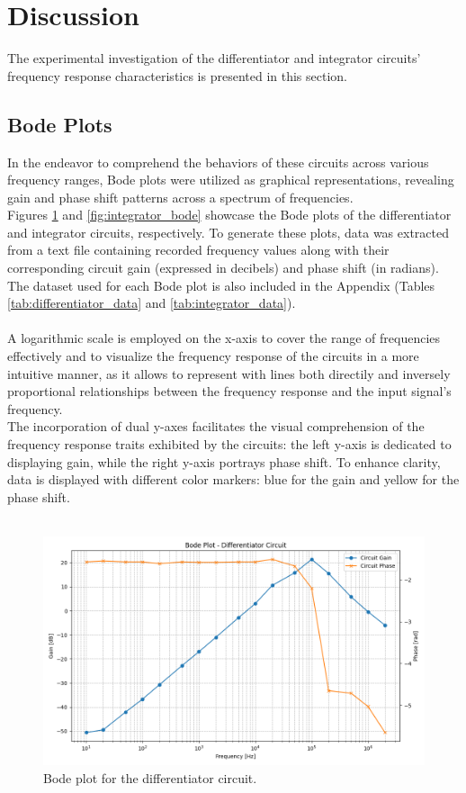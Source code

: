 \section{Discussion}
	The experimental investigation of the differentiator and integrator circuits' frequency response characteristics is presented in this section.
	
	\subsection{Bode Plots}
		In the endeavor to comprehend the behaviors of these circuits across various frequency ranges, Bode plots were utilized as graphical representations, revealing gain and phase shift patterns across a spectrum of frequencies. \\
		Figures \ref{fig:differentiator_bode} and \ref{fig:integrator_bode} showcase the Bode plots of the differentiator and integrator circuits, respectively.
		To generate these plots, data was extracted from a text file containing recorded frequency values along with their corresponding circuit gain (expressed in decibels) and phase shift (in radians). 
		The dataset used for each Bode plot is also included in the Appendix (Tables \ref{tab:differentiator_data} and \ref{tab:integrator_data}). \\\\
		A logarithmic scale is employed on the x-axis to cover the range of frequencies effectively and to visualize the frequency response of the circuits in a more intuitive manner,
		as it allows to represent with lines both directily and inversely proportional relationships between the frequency response and the input signal's frequency. \\
		The incorporation of dual y-axes facilitates the visual comprehension of the frequency response traits exhibited by the circuits: 
		the left y-axis is dedicated to displaying gain, while the right y-axis portrays phase shift.
		To enhance clarity, data is displayed with different color markers: blue for the gain and yellow for the phase shift. \\\\

		\begin{figure}[H]
			\centering
			\includegraphics[width=1\textwidth]{figures/differentiator/bode_plot.png}
			\caption{Bode plot for the differentiator circuit.}
			\label{fig:differentiator_bode} 
		\end{figure}

